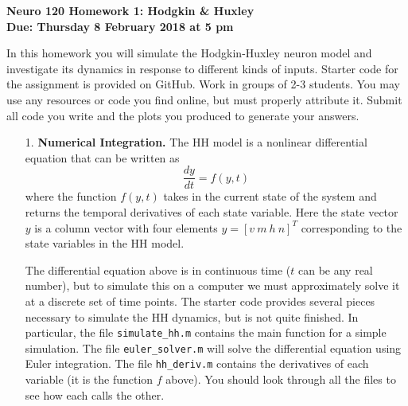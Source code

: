 \documentclass{article}
\begin{document}
\begin{flushleft}
\textbf{Neuro 120 Homework 1: Hodgkin \& Huxley\\
Due:  Thursday 8 February 2018 at 5 pm}\\
\end{flushleft}

In this homework you will simulate the Hodgkin-Huxley neuron model and investigate its dynamics in response to different kinds of inputs. Starter code for the assignment is provided on GitHub. Work in groups of 2-3 students. You may use any resources or code you find online, but must properly attribute it. Submit all code you write and the plots you produced to generate your answers.


\begin{itemize}

\item[1.]  \textbf{Numerical Integration.} 
The HH model is a nonlinear differential equation that can be written as
\begin{equation}
\frac{d y}{d t} = f(y,t) \label{nonlin_diffeq}
\end{equation}
where the function $f(y,t)$ takes in the current state of the system and returns the temporal derivatives of each state variable. Here the state vector $y$ is a column vector with four elements $y = [v ~m ~ h ~ n]^T$ corresponding to the state variables in the HH model.

The differential equation above is in continuous time ($t$ can be any real number), but to simulate this on a computer we must approximately solve it at a discrete set of time points. The starter code provides several pieces necessary to simulate the HH dynamics, but is not quite finished. In particular, the file \verb|simulate_hh.m| contains the main function for a simple simulation. The file \verb|euler_solver.m| will solve the differential equation using Euler integration. The file \verb|hh_deriv.m| contains the derivatives of each variable (it is the function $f$ above). You should look through all the files to see how each calls the other. 


\end{itemize}
\end{document}

